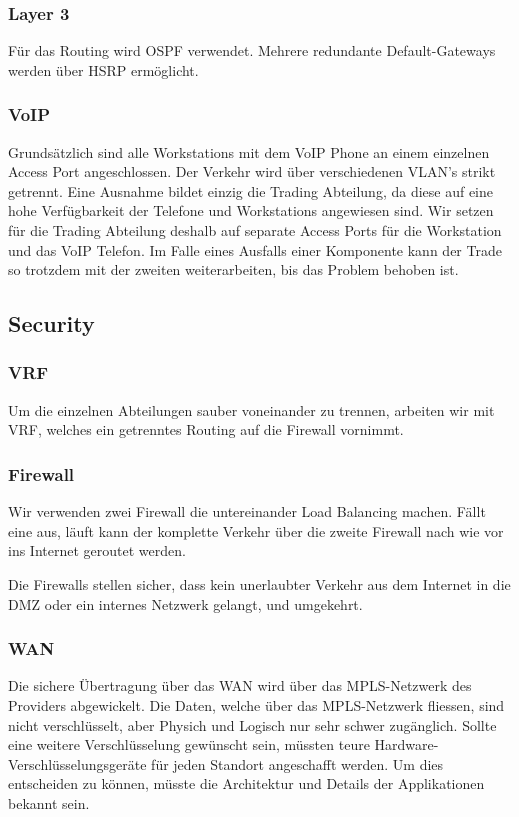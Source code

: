 \subsubsection{Layer 3}
Für das Routing wird OSPF verwendet. Mehrere redundante Default-Gateways werden über HSRP ermöglicht.

\subsubsection{VoIP}
Grundsätzlich sind alle Workstations mit dem VoIP Phone an einem einzelnen Access Port angeschlossen. Der Verkehr wird über verschiedenen VLAN's strikt getrennt. Eine Ausnahme bildet einzig die Trading Abteilung, da diese auf eine hohe Verfügbarkeit der Telefone und Workstations angewiesen sind. Wir setzen für die Trading Abteilung deshalb auf separate Access Ports für die Workstation und das VoIP Telefon. Im Falle eines Ausfalls einer Komponente kann der Trade so trotzdem mit der zweiten weiterarbeiten, bis das Problem behoben ist.

\subsection{Security}

\subsubsection{VRF}
Um die einzelnen Abteilungen sauber voneinander zu trennen, arbeiten wir mit VRF, welches ein getrenntes Routing auf die Firewall vornimmt.

\subsubsection{Firewall}
Wir verwenden zwei Firewall die untereinander Load Balancing machen. Fällt eine aus, läuft kann der komplette Verkehr über die zweite Firewall nach wie vor ins Internet geroutet werden.

Die Firewalls stellen sicher, dass kein unerlaubter Verkehr aus dem Internet in die DMZ oder ein internes Netzwerk gelangt, und umgekehrt.

\subsubsection{WAN}
Die sichere Übertragung über das WAN wird über das MPLS-Netzwerk des Providers abgewickelt. Die Daten, welche über das MPLS-Netzwerk fliessen, sind nicht verschlüsselt, aber Physich und Logisch nur sehr schwer zugänglich. Sollte eine weitere Verschlüsselung gewünscht sein, müssten teure Hardware-Verschlüsselungsgeräte für jeden Standort angeschafft werden. Um dies entscheiden zu können, müsste die Architektur und Details der Applikationen bekannt sein.

